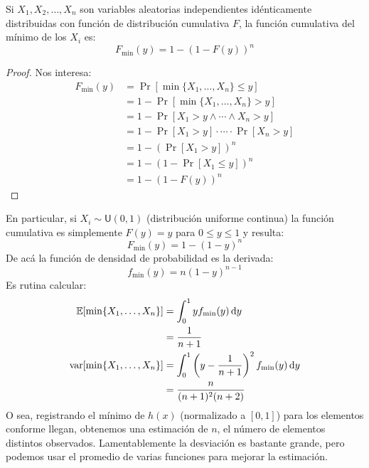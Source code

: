   \begin{theorem}
    \label{theo:minimum-iid}
    Si \(X_1, X_2, \dotsc, X_n\) son variables aleatorias
    independientes idénticamente distribuidas
    con función de distribución cumulativa \(F\),
    la función cumulativa del mínimo de los \(X_i\)
    es:
    \begin{equation*}
      F_{\text{min}}(y)
        = 1 - (1 - F(y))^n
    \end{equation*}
  \end{theorem}
  \begin{proof}
    Nos interesa:
    \begin{align*}
      F_{\text{min}}(y)
        &= \Pr[ \min\{ X_1, \dotsc, X_n \} \le y ] \\
        &= 1 - \Pr[ \min\{ X_1, \dotsc, X_n \} > y ] \\
        &= 1 - \Pr[ X_1 > y \wedge \dotsm \wedge X_n > y ] \\
        &= 1 - \Pr[ X_1 > y ] \cdot \dotsm \cdot \Pr[ X_n > y ] \\
        &= 1 - ( \Pr[ X_1 > y ] )^n \\
        &= 1 - (1 - \Pr[ X_1 \le y ] )^n \\
        &= 1 - (1 - F(y))^n
    \end{align*}
    \qedhere
  \end{proof}
  En particular,
  si \(X_i \sim \mathrm{\boldsymbol{\mathsf{U}}}(0, 1)\)
  (distribución uniforme continua)
  la función cumulativa es simplemente \(F(y) = y\) para \(0 \le y \le 1\)
  y resulta:
  \begin{equation*}
    F_{\text{min}}(y)
      = 1 - (1 - y)^n
  \end{equation*}
  De acá la función de densidad de probabilidad es la derivada:
  \begin{equation*}
    f_{\text{min}}(y)
      = n (1 - y)^{n - 1}
  \end{equation*}
  Es rutina calcular:
  \begin{align*}
    \operatorname{\mathbb{E}}[\min\{ X_1, \dotsc, X_n \}]
      &= \int_0^1 y f_{\text{min}}(y) \, \mathrm{d} y \\
      &= \frac{1}{n + 1} \\
    \operatorname{var}[\min\{ X_1, \dotsc, X_n \}]
      &= \int_0^1
           \left( y - \frac{1}{n + 1} \right)^2
             f_{\text{min}}(y) \, \mathrm{d} y \\
      &= \frac{n}{(n + 1)^2 (n + 2)}
  \end{align*}
  O sea,
  registrando el mínimo de \(h(x)\)
  (normalizado a \([0, 1]\))
  para los elementos conforme llegan,
  obtenemos una estimación de \(n\),
  el número de elementos distintos observados.
  Lamentablemente la desviación es bastante grande,
  pero podemos usar el promedio de varias funciones para mejorar la estimación.

